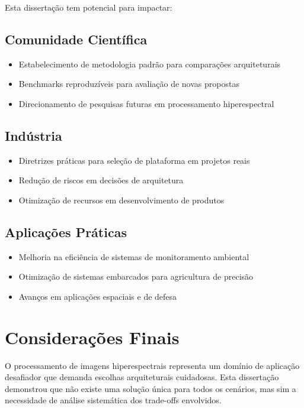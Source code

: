 Esta dissertação tem potencial para impactar:

\subsection{Comunidade Científica}
\begin{itemize}
    \item Estabelecimento de metodologia padrão para comparações arquiteturais
    \item Benchmarks reproduzíveis para avaliação de novas propostas
    \item Direcionamento de pesquisas futuras em processamento hiperespectral
\end{itemize}

\subsection{Indústria}
\begin{itemize}
    \item Diretrizes práticas para seleção de plataforma em projetos reais
    \item Redução de riscos em decisões de arquitetura
    \item Otimização de recursos em desenvolvimento de produtos
\end{itemize}

\subsection{Aplicações Práticas}
\begin{itemize}
    \item Melhoria na eficiência de sistemas de monitoramento ambiental
    \item Otimização de sistemas embarcados para agricultura de precisão
    \item Avanços em aplicações espaciais e de defesa
\end{itemize}

\section{Considerações Finais}\label{sec:consideracoes_finais}

O processamento de imagens hiperespectrais representa um domínio de aplicação desafiador que demanda escolhas arquiteturais cuidadosas. Esta dissertação demonstrou que não existe uma solução única para todos os cenários, mas sim a necessidade de análise sistemática dos trade-offs envolvidos.

